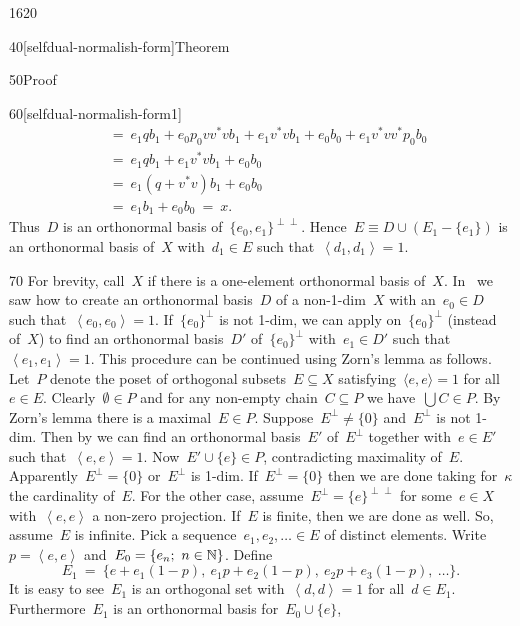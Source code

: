\begin{parsec}{1620}
\begin{point}{40}[selfdual-normalish-form]{Theorem}
\begin{point}{50}{Proof}
\begin{point}{60}[selfdual-normalish-form1]
\begin{align*}
    &\ = \ e_1 q b_1 + e_0 p_0 vv^* vb_1 + e_1v^*vb_1 + e_0 b_0 + e_1v^* vv^* p_0 b_0 \\
    &\ = \ e_1 q b_1 + e_1v^*vb_1 + e_0 b_0  \\
    &\ = \ e_1 (q + v^*v) b_1 + e_0 b_0  \\
    &\ = \ e_1 b_1 + e_0 b_0 \ = \ x.
\end{align*}
Thus~$D$ is an orthonormal basis of~$\{e_0, e_1\}^{\perp\perp}$.
Hence~$E \equiv D \cup (E_1 - \{e_1\})$ is an orthonormal basis of~$X$
with~$d_1 \in E$ such that~$\left<d_1,d_1\right>=1$.
\end{point}
\begin{point}{70}%
For brevity, call~$X$  if there is a one-element orthonormal basis of~$X$.
In~ we saw
    how to create an orthonormal basis~$D$ of a non-1-dim~$X$
    with an~$e_0 \in D$ such that~$\left<e_0,e_0\right>=1$.
If~$\{e_0\}^\perp$ is not 1-dim,
    we can apply 
    on~$\{e_0\}^\perp$ (instead of~$X$)
    to find an orthonormal basis~$D'$ of~$\{e_0\}^\perp$
    with~$e_1 \in D'$ such that~$\left<e_1,e_1\right>=1$.
This procedure can be continued using Zorn's lemma as follows.
Let~$P$ denote the poset of orthogonal subsets~$E \subseteq X$
    satisfying~$\langle e,e\rangle = 1$ for all~$e\in E$.
Clearly~$\emptyset\in P$
and for any non-empty chain~$C \subseteq P$
    we have~$\bigcup C \in P$.
By Zorn's lemma there is a maximal~$E \in P$.
Suppose~$E^\perp \neq \{0\}$ and~$E^\perp$ is not 1-dim.
Then by 
    we can find an orthonormal basis~$E'$ of~$E^\perp$
    together with~$e \in E'$ such that~$\left<e,e\right>=1$.
Now~$E' \cup \{e\} \in P$, contradicting maximality of~$E$.
Apparently~$E^\perp = \{0\}$ or~$E^\perp$ is 1-dim.
If~$E^\perp = \{0\}$
    then we are done
    taking for~$\kappa$ the cardinality of~$E$.
For the other case, assume~$E^\perp = \{e\}^{\perp\perp}$
    for some~$e \in X$ with~$\left<e,e\right>$ a non-zero projection.
If~$E$ is finite, then we are done as well.
So, assume~$E$ is infinite.
Pick a sequence~$e_1, e_2, \ldots \in E$ of distinct elements.
Write~$p = \left<e,e\right>$
    and~$E_0 = \{e_n;\ n\in \mathbb{N}\}$.
Define
\begin{equation*}
    E_1 \ =\  \{e + e_1(1-p), \ e_1p + e_2(1-p),\  e_2p  +e_3(1-p),\  \ldots \}.
\end{equation*}
It is easy to see~$E_1$ is an orthogonal set
    with~$\left<d,d\right>=1$ for all~$d \in E_1$.
Furthermore~$E_1$ is an orthonormal basis for~$E_0 \cup \{e\}$,

\end{point}
\end{point}
\end{point}
\end{parsec}
